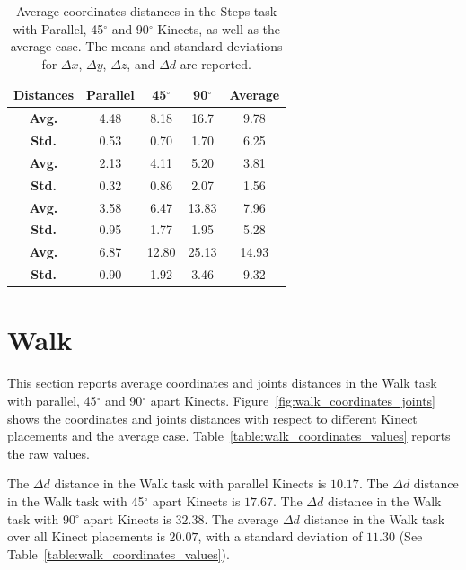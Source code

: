 \begin{table}[!h]
\centering
  
  \begin{tabulary}{1.0\linewidth}{||c c c c c||} 
   \hline
   \textbf{Distances} & \textbf{Parallel} & \textbf{45$^{\circ}$} & \textbf{90$^{\circ}$} & \textbf{Average} \\ [0.5ex] 
   \hline\hline
   \textbf{Avg.}  & 4.48 & 8.18 & 16.7 & 9.78 \\
   \hline
   \textbf{Std.}  & 0.53 & 0.70 & 1.70 & 6.25 \\
   \hline
   \textbf{Avg.}  & 2.13 & 4.11 & 5.20 & 3.81 \\
   \hline
   \textbf{Std.}  & 0.32 & 0.86 & 2.07 & 1.56 \\
   \hline
   \textbf{Avg.}  & 3.58 & 6.47 & 13.83 & 7.96 \\
   \hline
   \textbf{Std.}  & 0.95 & 1.77 & 1.95 & 5.28 \\
   \hline
   \textbf{Avg.}  & 6.87 & 12.80 & 25.13 & 14.93 \\
   \hline
   \textbf{Std.}  & 0.90 & 1.92 & 3.46 & 9.32 \\
   \hline
  \end{tabulary}

  \caption{Average coordinates distances in the Steps task with Parallel, 45$^{\circ}$ and 90$^{\circ}$ Kinects, as well as the average case. The means and standard deviations for $\Delta x$, $\Delta y$, $\Delta z$, and $\Delta d$ are reported.}
  
  \label{table:steps_coordinates_values}
\end{table}

% 
% 
\section{Walk}
\label{sec:results_walk}

This section reports average coordinates and joints distances in the Walk task with parallel, 45$^{\circ}$ and 90$^{\circ}$ apart Kinects. Figure~\ref{fig:walk_coordinates_joints} shows the coordinates and joints distances with respect to different Kinect placements and the average case. Table~\ref{table:walk_coordinates_values} reports the raw values.

The $\Delta d$ distance in the Walk task with parallel Kinects is $10.17$. The $\Delta d$ distance in the Walk task with 45$^{\circ}$ apart Kinects is $17.67$. The $\Delta d$ distance in the Walk task with 90$^{\circ}$ apart Kinects is $32.38$. The average $\Delta d$ distance in the Walk task over all Kinect placements is $20.07$, with a standard deviation of $11.30$ (See Table~\ref{table:walk_coordinates_values}).

